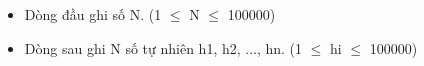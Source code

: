 \begin{itemize}
	\item     Dòng đầu ghi số N. (1  $\le$  N  $\le$  100000)   
\end{itemize}
\begin{itemize}
	\item     Dòng sau ghi N số tự nhiên h1, h2, ..., hn. (1  $\le$  hi  $\le$  100000)   
\end{itemize}
